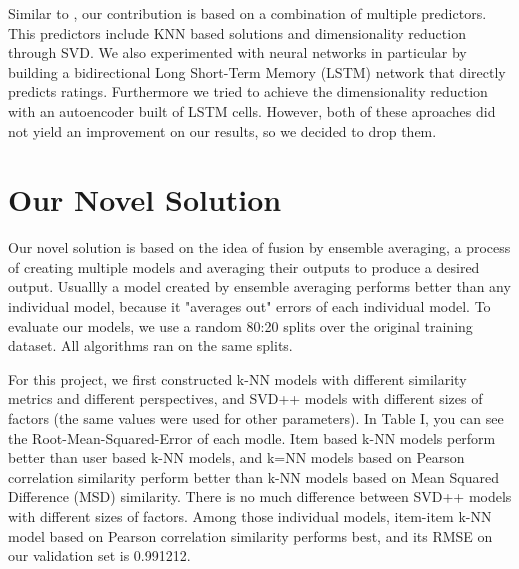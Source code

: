 \documentclass[10pt,conference,compsocconf]{IEEEtran}
\begin{document}
Similar to \cite{paterek}, our contribution is based on a combination of multiple predictors. This predictors include KNN based solutions and dimensionality reduction through SVD. We also experimented with neural networks in particular by building a bidirectional Long Short-Term Memory (LSTM) network that directly predicts ratings. Furthermore we tried to achieve the dimensionality reduction with an autoencoder built of LSTM cells. However, both of these aproaches did not yield an improvement on our results, so we decided to drop them.

\section{Our Novel Solution}
Our novel solution is based on the idea of fusion by ensemble averaging, a process of creating multiple models and averaging their outputs to produce a desired output\cite{ariel}. Usuallly a model created by ensemble averaging performs better than any individual model, because it "averages out" errors of each individual model. To evaluate our models, we use a random 80:20 splits over the original training dataset. All algorithms ran on the same splits. 

For this project, we first constructed k-NN models with different similarity metrics and different perspectives, and SVD++ models with different sizes of factors (the same values were used for other parameters). In Table I, you can see the Root-Mean-Squared-Error of each modle. Item based k-NN models perform better than user based k-NN models, and k=NN models based on Pearson correlation similarity perform better than k-NN models based on Mean Squared Difference (MSD) similarity. There is no much difference between SVD++ models with different sizes of factors. Among those individual models, item-item k-NN model based on Pearson correlation similarity performs best, and its RMSE on our validation set is 0.991212.
\end{document}
